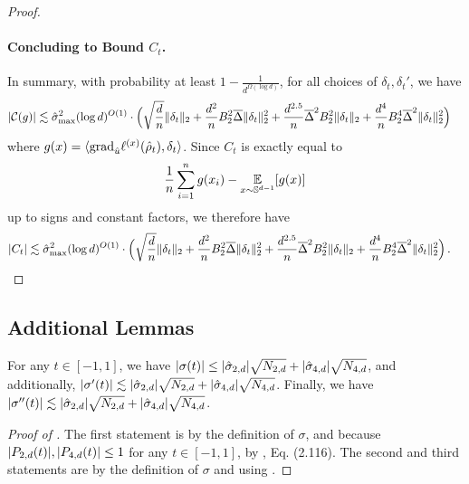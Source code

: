 \begin{proof}
\paragraph{Concluding to Bound $C_t$.} In summary, with probability at least $1 - \frac{1}{d^{\Omega(\log d)}}$, for all choices of $\delta_t, \delta_t'$, we have
\begin{align}
|\mathcal{C}(g)| 
& \lesssim \hat{\sigma}_{\textup{max}}^2 (\log d)^{O(1)} \cdot \Big(\sqrt{\frac{d}{n}} \|\delta_t\|_2 + \frac{d^2}{n} B_2^2 \overline{\Delta} \|\delta_t\|_2^2 + \frac{d^{2.5}}{n} \overline{\Delta}^2 B_2^2 \|\delta_t\|_2  + \frac{d^4}{n} B_2^4 \overline{\Delta}^2 \|\delta_t\|_2^2 \Big)
\end{align}
where $g(x) = \langle {\textup{grad}}_{\hat{u}} \ell^{(x)}({\hat{\rho}}_t), \delta_t \rangle$. Since $C_t$ is exactly equal to
\begin{align}
\frac{1}{n} \sum_{i = 1}^n g(x_i) - \operatorname*{\mathbb{E}}_{x \sim \mathbb{S}^{d - 1}} [g(x)]
\end{align}
up to signs and constant factors, we therefore have
\begin{align}
|C_t|
& \lesssim \hat{\sigma}_{\textup{max}}^2 (\log d)^{O(1)} \cdot \Big(\sqrt{\frac{d}{n}} \|\delta_t\|_2 + \frac{d^2}{n} B_2^2 \overline{\Delta} \|\delta_t\|_2^2 + \frac{d^{2.5}}{n} \overline{\Delta}^2 B_2^2 \|\delta_t\|_2  + \frac{d^4}{n} B_2^4 \overline{\Delta}^2 \|\delta_t\|_2^2 \Big) \,.
\end{align}


\end{proof}

\subsection{Additional Lemmas}

\begin{lemma} \label{lemma:sigma_bound}
For any $t \in [-1, 1]$, we have $|\sigma(t)| \leq |\hat{\sigma}_{2, d}| \sqrt{N_{2, d}} + |\hat{\sigma}_{4, d}| \sqrt{N_{4, d}}$, and additionally, $|\sigma'(t)| \lesssim |\hat{\sigma}_{2, d}| \sqrt{N_{2, d}} + |\hat{\sigma}_{4, d}| \sqrt{N_{4, d}}$. Finally, we have $|\sigma''(t)| \lesssim |\hat{\sigma}_{2, d}| \sqrt{N_{2, d}} + |\hat{\sigma}_{4, d}| \sqrt{N_{4, d}}$.
\end{lemma}
\begin{proof}[Proof of ]
The first statement is by the definition of $\sigma$, and because $|{P_{2, d}}(t)|, |{P_{4, d}}(t)| \leq 1$ for any $t \in [-1, 1]$, by \citet{atkinson2012spherical}, Eq. (2.116). The second and third statements are by the definition of $\sigma$ and using .
\end{proof}

